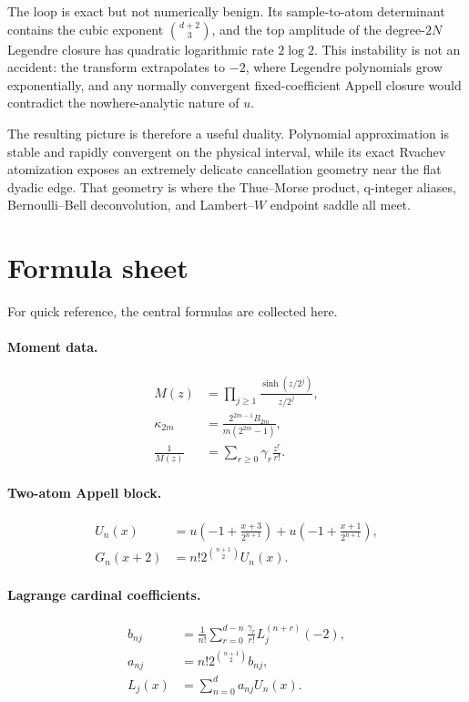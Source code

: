 \documentclass[11pt,oneside]{article}
\theoremstyle{definition}
\theoremstyle{remark}
\begin{document}
The loop is exact but not numerically benign.  Its sample-to-atom determinant
contains the cubic exponent $\binom{d+2}{3}$, and the top amplitude of the
degree-$2N$ Legendre closure has quadratic logarithmic rate $2\log2$.
This instability is not an accident: the transform extrapolates to $-2$,
where Legendre polynomials grow exponentially, and any normally convergent
fixed-coefficient Appell closure would contradict the nowhere-analytic
nature of $u$.

The resulting picture is therefore a useful duality.  Polynomial
approximation is stable and rapidly convergent on the physical interval,
while its exact Rvachev atomization exposes an extremely delicate
cancellation geometry near the flat dyadic edge.  That geometry is where the
Thue--Morse product, q-integer aliases, Bernoulli--Bell deconvolution, and
Lambert--$W$ endpoint saddle all meet.

\appendix

\section{Formula sheet}
For quick reference, the central formulas are collected here.

\paragraph{Moment data.}
\begin{align*}
 M(z)&=\prod_{j\ge1}\frac{\sinh(z/2^j)}{z/2^j},\\
 \kappa_{2m}&=\frac{2^{2m-1}B_{2m}}{m(2^{2m}-1)},\\
 \frac1{M(z)}&=\sum_{r\ge0}\gamma_r\frac{z^r}{r!}.
\end{align*}

\paragraph{Two-atom Appell block.}
\begin{align*}
 U_n(x)&=u\!\left(-1+\frac{x+3}{2^{n+1}}\right)
 +u\!\left(-1+\frac{x+1}{2^{n+1}}\right),\\
 G_n(x+2)&=n!2^{\binom{n+1}{2}}U_n(x).
\end{align*}

\paragraph{Lagrange cardinal coefficients.}
\begin{align*}
 b_{nj}&=\frac1{n!}\sum_{r=0}^{d-n}
 \frac{\gamma_r}{r!}L_j^{(n+r)}(-2),\\
 a_{nj}&=n!2^{\binom{n+1}{2}}b_{nj},\\
 L_j(x)&=\sum_{n=0}^{d}a_{nj}U_n(x).
\end{align*}
\end{document}
